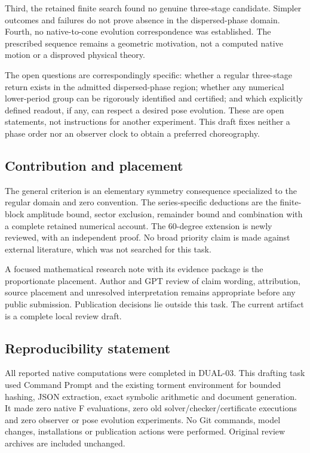 \documentclass[11pt,a4paper]{article}
\begin{document}
Third, the retained finite search found no genuine three-stage candidate. Simpler outcomes and failures do not prove absence in the dispersed-phase domain. Fourth, no native-to-cone evolution correspondence was established. The prescribed sequence remains a geometric motivation, not a computed native motion or a disproved physical theory.

The open questions are correspondingly specific: whether a regular three-stage return exists in the admitted dispersed-phase region; whether any numerical lower-period group can be rigorously identified and certified; and which explicitly defined readout, if any, can respect a desired pose evolution. These are open statements, not instructions for another experiment. This draft fixes neither a phase order nor an observer clock to obtain a preferred choreography.

\subsection*{Contribution and placement}
The general criterion is an elementary symmetry consequence specialized to the regular domain and zero convention. The series-specific deductions are the finite-block amplitude bound, sector exclusion, remainder bound and combination with a complete retained numerical account. The 60-degree extension is newly reviewed, with an independent proof. No broad priority claim is made against external literature, which was not searched for this task.

A focused mathematical research note with its evidence package is the proportionate placement. Author and GPT review of claim wording, attribution, source placement and unresolved interpretation remains appropriate before any public submission. Publication decisions lie outside this task. The current artifact is a complete local review draft.

\subsection*{Reproducibility statement}
All reported native computations were completed in DUAL-03. This drafting task used Command Prompt and the existing torment environment for bounded hashing, JSON extraction, exact symbolic arithmetic and document generation. It made zero native F evaluations, zero old solver/checker/certificate executions and zero observer or pose evolution experiments. No Git commands, model changes, installations or publication actions were performed. Original review archives are included unchanged.
\end{document}
